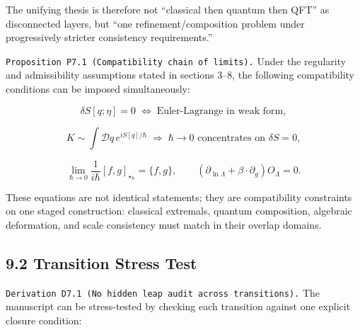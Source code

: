 \documentclass[
]{article}
\begin{document}
The unifying thesis is therefore not ``classical then quantum then QFT''
as disconnected layers, but ``one refinement/composition problem under
progressively stricter consistency requirements.''

\texttt{Proposition\ P7.1\ (Compatibility\ chain\ of\ limits).} Under
the regularity and admissibility assumptions stated in sections 3--8,
the following compatibility conditions can be imposed simultaneously:

\[
\delta S[q;\eta]=0
\;\Longleftrightarrow\;
\text{Euler-Lagrange in weak form},
\]

\[
K \sim \int \mathcal Dq\,e^{iS[q]/\hbar}
\;\Longrightarrow\;
\hbar\to 0 \text{ concentrates on } \delta S=0,
\]

\[
\lim_{\hbar\to 0}\frac{1}{i\hbar}[f,g]_{\star_\hbar}=\{f,g\},
\qquad
\left(\partial_{\ln\Lambda}+\beta\cdot\partial_g\right)O_\Lambda=0.
\]

These equations are not identical statements; they are compatibility
constraints on one staged construction: classical extremals, quantum
composition, algebraic deformation, and scale consistency must match in
their overlap domains.

\hypertarget{transition-stress-test}{%
\subsection{9.2 Transition Stress Test}\label{transition-stress-test}}

\texttt{Derivation\ D7.1\ (No\ hidden\ leap\ audit\ across\ transitions).}
The manuscript can be stress-tested by checking each transition against
one explicit closure condition:
\end{document}
